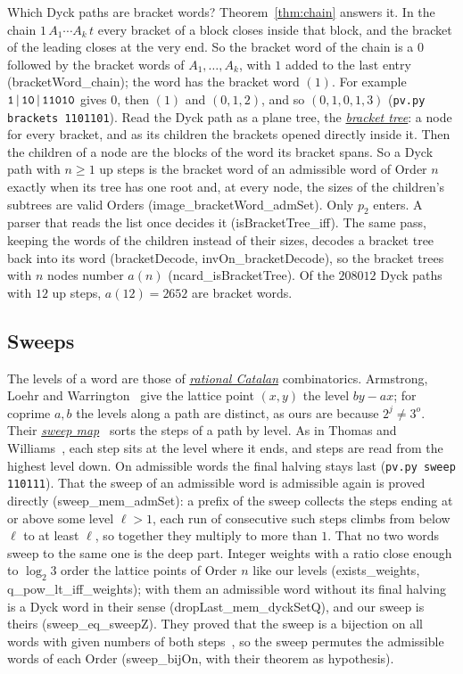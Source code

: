 \documentclass[11pt,a4paper,titlepage]{article}
\makeatletter
\newcommand{\termhere}[1]{\leavevmode
  \Hy@raisedlink{\hyper@anchorstart{term:#1}\hyper@anchorend}}
\newcommand{\keyterm}[2]{\hyperlink{box:#1}{\emph{#2}}}
\newcommand{\lean}[1]{\textsf{#1}}
\newcommand{\pv}[1]{\texttt{pv.py #1}}
\makeatother
\begin{document}
Which Dyck paths are bracket words? Theorem~\ref{thm:chain} answers it. In the
chain $1\,A_1 \cdots A_k\,t$ every bracket of a block closes inside that block,
and the bracket of the leading  closes at the very end. So the bracket word
of the chain is a $0$ followed by the bracket words of $A_1, \dots, A_k$, with $1$
added to the last entry (\lean{bracketWord\_chain}); the word  has the
bracket word $(1)$. For example $\text{\texttt{1}}\,|\,\text{\texttt{10}}\,|\,\text{\texttt{11010}}$ gives $0$, then
$(1)$ and $(0, 1, 2)$, and so $(0, 1, 0, 1, 3)$ (\pv{brackets 1101101}).
\termhere{brackettree}Read the Dyck path as a plane
tree, the \keyterm{brackettree}{bracket tree}: a node for every bracket, and as its children
the brackets opened directly inside it. Then the children of a node are the
blocks of the word its bracket spans. So a Dyck path with $n \ge 1$ up steps is the
bracket word of an admissible word of Order $n$ exactly when its tree has one
root and, at every node, the sizes of the children's subtrees are valid Orders
(\lean{image\_bracketWord\_admSet}). Only $p_2$ enters. A parser that reads the
list once decides it (\lean{isBracketTree\_iff}). The same
pass, keeping the words of the children instead of their sizes, decodes a bracket
tree back into its word (\lean{bracketDecode}, \lean{invOn\_bracketDecode}), so
the bracket trees with $n$ nodes number $a(n)$ (\lean{ncard\_isBracketTree}). Of the
$208012$ Dyck paths with $12$ up steps, $a(12) = 2652$ are bracket words.

\subsection*{Sweeps}
\label{sec:sweeps}
\termhere{ratcatalan}\termhere{sweepmap}The levels of a word are those of \keyterm{ratcatalan}{rational Catalan} combinatorics. Armstrong, Loehr and
Warrington~\cite{ALW2014} give the lattice point $(x, y)$ the level $by - ax$;
for coprime $a, b$ the levels along a path are distinct, as ours are because
$2^j \ne 3^o$. Their \keyterm{sweepmap}{sweep map}~\cite{ALW2015} sorts the steps of a path by level. As in
Thomas and Williams~\cite{ThomasWilliams2018}, each step sits at the level where it
ends, and steps are read from the highest level down. On admissible words the
final halving stays last (\pv{sweep 110111}). That the sweep of an admissible word is
admissible again is proved directly
(\lean{sweep\_mem\_admSet}): a prefix of the sweep collects the steps ending at or
above some level $\ell > 1$, each run of consecutive such steps climbs from below $\ell$
to at least $\ell$, so together they multiply to more than $1$. That no two words
sweep to the same one is the deep part. Integer weights with a ratio close enough to $\log_2 3$
order the lattice points of Order $n$ like our levels
(\lean{exists\_weights}, \lean{q\_pow\_lt\_iff\_weights}); with them an admissible word without its final halving is
a Dyck word in their sense (\lean{dropLast\_mem\_dyckSetQ}), and our sweep is theirs (\lean{sweep\_eq\_sweepZ}).
They proved that the sweep is a bijection on all words with given
numbers of both steps~\cite[Thm.~6.3]{ThomasWilliams2018}, so the sweep permutes the admissible
words of each Order (\lean{sweep\_bijOn}, with their theorem as hypothesis).
\end{document}
